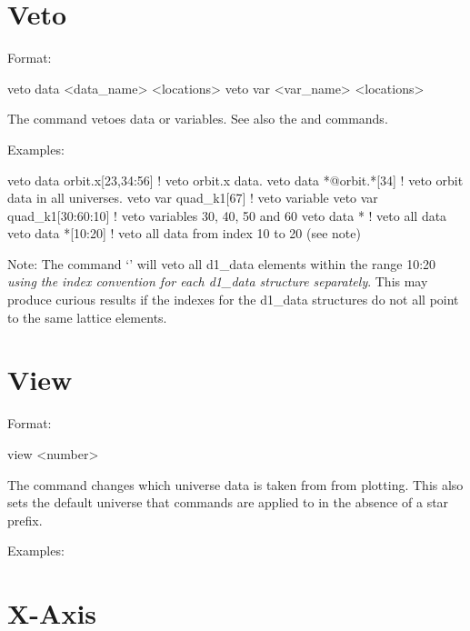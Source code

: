 {{{%
\section{Veto}
\label{s:veto}

Format:
\begin{example}
  veto data <data_name> <locations>
  veto var <var_name> <locations>
\end{example}

\vskip 0.2in 
The  command vetoes data or variables. See also the
 and  commands.

Examples:
\begin{example}
  veto data orbit.x[23,34:56]  ! veto orbit.x data.
  veto data *@orbit.*[34]      ! veto orbit data in all universes.
  veto var quad_k1[67]         ! veto variable
  veto var quad_k1[30:60:10]   ! veto variables 30, 40, 50 and 60
  veto data *                  ! veto all data
  veto data *[10:20]           ! veto all data from index 10 to 20 (see note)
\end{example}

Note: The command `' will veto all d1\_data elements
within the range 10:20 \textit{using the index convention for each d1\_data
structure separately}. This may produce curious results if the
indexes for the d1\_data structures do not all point to the same lattice
elements. 

\section{View}
\label{s:view}

Format:
\begin{example}
  view <number>
\end{example}

\vskip 0.2in 
The  command changes which universe data is taken from from
plotting.  This also sets the default universe that commands are
applied to in the absence of a star prefix.

Examples:

\section{X-Axis}
\label{s:x-axis}

}}}

